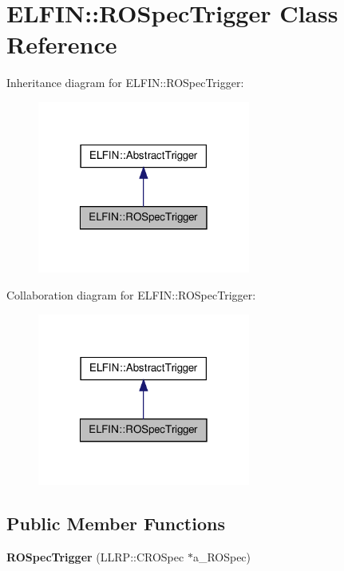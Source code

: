\hypertarget{class_e_l_f_i_n_1_1_r_o_spec_trigger}{\section{E\-L\-F\-I\-N\-:\-:R\-O\-Spec\-Trigger Class Reference}
\label{class_e_l_f_i_n_1_1_r_o_spec_trigger}
}


Inheritance diagram for E\-L\-F\-I\-N\-:\-:R\-O\-Spec\-Trigger\-:
\nopagebreak
\begin{figure}[H]
\begin{center}
\leavevmode
\includegraphics[width=198pt]{class_e_l_f_i_n_1_1_r_o_spec_trigger__inherit__graph}
\end{center}
\end{figure}


Collaboration diagram for E\-L\-F\-I\-N\-:\-:R\-O\-Spec\-Trigger\-:
\nopagebreak
\begin{figure}[H]
\begin{center}
\leavevmode
\includegraphics[width=198pt]{class_e_l_f_i_n_1_1_r_o_spec_trigger__coll__graph}
\end{center}
\end{figure}
\subsection*{Public Member Functions}
\begin{DoxyCompactItemize}
\item 
\hypertarget{class_e_l_f_i_n_1_1_r_o_spec_trigger_a59e98970f9b2dcfe7eaa0015a4603fed}{{\bfseries R\-O\-Spec\-Trigger} (L\-L\-R\-P\-::\-C\-R\-O\-Spec $\ast$a\-\_\-\-R\-O\-Spec)}\label{class_e_l_f_i_n_1_1_r_o_spec_trigger_a59e98970f9b2dcfe7eaa0015a4603fed}

\end{DoxyCompactItemize}
